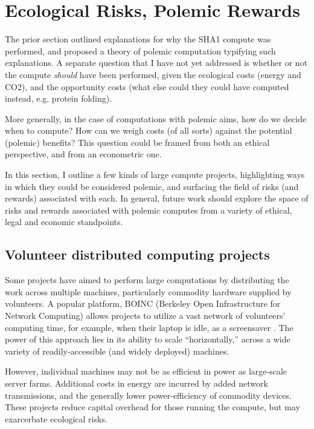 \documentclass[sigconf]{acmart}
\begin{document}
\section{Ecological Risks, Polemic Rewards}
\label{sec:orgaafd21b}

The prior section outlined explanations for why the SHA1 compute was performed, 
and proposed a theory of polemic computation typifying such explanations.
A separate question that I have not yet addressed 
is whether or not the compute \emph{should} have been performed,
given the ecological costs (energy and CO2), and the opportunity costs (what else could they could have computed instead, e.g. protein folding). 

More generally, in the case of computations with polemic aims,
how do we decide when to compute?
How can we weigh costs (of all sorts) against the potential (polemic) benefits?
This question could be framed from both an ethical perspective, 
and from an econometric one.

In this section, I outline a few kinds of large compute projects, 
highlighting ways in which they could be considered polemic,
and surfacing the field of risks (and rewards) associated with each.
In general, future work should explore the space of risks and rewards
associated with polemic computes from a variety of ethical, legal and economic standpoints.

\subsection{Volunteer distributed computing projects}
\label{sec:org2692ec5}

Some projects have aimed to perform large computations by distributing the work across multiple machines,
particularly commodity hardware supplied by volunteers.
A popular platform, BOINC (Berkeley Open Infrastructure for Network Computing)
allows projects to utilize a vast network of volunteers' computing time, 
for example, when their laptop is idle, as a screensaver
\cite{Anderson2004}.
The power of this approach lies in its ability to scale ``horizontally,''
across a wide variety of readily-accessible (and widely deployed) machines.

However, individual machines may not be as efficient in power 
as large-scale server farms.
Additional costs in energy are incurred by added network transmissions,
and the generally lower power-efficiency of commodity devices.
These projects reduce capital overhead for those running the compute,
but may exarcerbate ecological risks.
\end{document}
